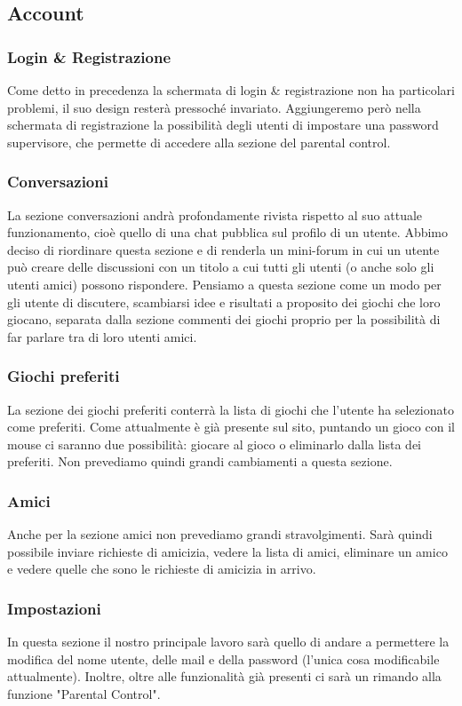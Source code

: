 \documentclass[../Report.tex]{subfiles}
\begin{document}
    \subsection{Account}
    \subsubsection{Login \& Registrazione}
    Come detto in precedenza la schermata di login \& registrazione non ha particolari problemi, il suo design resterà pressoché invariato. Aggiungeremo però nella schermata di registrazione la possibilità degli utenti di impostare una password supervisore, che permette di accedere alla sezione del parental control.
    
    \subsubsection{Conversazioni}
    La sezione conversazioni andrà profondamente rivista rispetto al suo attuale funzionamento, cioè quello di una chat pubblica sul profilo di un utente. Abbimo deciso di riordinare questa sezione e di renderla un mini-forum in cui un utente può creare delle discussioni con un titolo a cui tutti gli utenti (o anche solo gli utenti amici) possono rispondere. Pensiamo a questa sezione come un modo per gli utente di discutere, scambiarsi idee e risultati a proposito dei giochi che loro giocano, separata dalla sezione commenti dei giochi proprio per la possibilità di far parlare tra di loro utenti amici. 
    \subsubsection{Giochi preferiti}
    La sezione dei giochi preferiti conterrà la lista di giochi che l'utente ha selezionato come preferiti. Come attualmente è già presente sul sito, puntando un gioco con il mouse ci saranno due possibilità: giocare al gioco o eliminarlo dalla lista dei preferiti. Non prevediamo quindi grandi cambiamenti a questa sezione.
    \subsubsection{Amici}
    Anche per la sezione amici non prevediamo grandi stravolgimenti. Sarà quindi possibile inviare richieste di amicizia, vedere la lista di amici, eliminare un amico e vedere quelle che sono le richieste di amicizia in arrivo. 
    \subsubsection{Impostazioni}
    In questa sezione il nostro principale lavoro sarà quello di andare a permettere la modifica del nome utente, delle mail e della password (l'unica cosa modificabile attualmente). Inoltre, oltre alle funzionalità già presenti ci sarà un rimando alla funzione "Parental Control".
\end{document}
